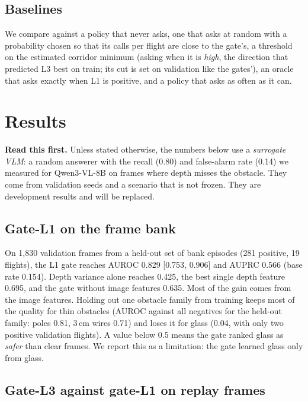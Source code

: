 \subsection{Baselines}
\label{sec:gate-baselines}

We compare against a policy that never asks, one that asks at random with a probability chosen so that its calls per
flight are close to the gate's, a threshold on the estimated corridor minimum (asking when it is \emph{high}, the
direction that predicted L3 best on train; its cut is set on validation like the gates'), an oracle that asks exactly
when L1 is positive, and a policy that asks as often as it can.

\section{Results}
\label{sec:gate-results}

\noindent\textbf{Read this first.} Unless stated otherwise, the numbers below use a \emph{surrogate VLM}: a random
answerer with the recall (0.80) and false-alarm rate (0.14) we measured for Qwen3-VL-8B on frames where depth misses
the obstacle. They come from validation seeds and a scenario that is not frozen. They are development results and
will be replaced. 

\subsection{Gate-L1 on the frame bank}

On 1{,}830 validation frames from a held-out set of bank episodes (281 positive, 19 flights), the L1 gate reaches
AUROC 0.829 [0.753, 0.906] and AUPRC 0.566 (base rate 0.154). Depth variance alone reaches 0.425, the best single
depth feature 0.695, and the gate without image features 0.635. Most of the gain comes from the image features.
Holding out one obstacle family from training keeps most of the quality for thin obstacles (AUROC against all
negatives for the held-out family: poles 0.81, 3\,cm wires 0.71) and loses it for glass (0.04, with only two
positive validation flights). A value below 0.5 means the gate ranked glass as \emph{safer} than clear frames. We
report this as a limitation: the gate learned glass only from glass.

\subsection{Gate-L3 against gate-L1 on replay frames}

